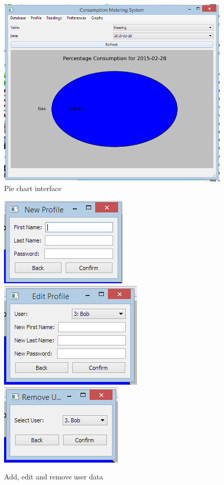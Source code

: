 \begin{landscape}
\begin{figure}[H]
	\includegraphics{./maintenance/images/UI_Pie_View.png}
	\caption{Pie chart interface}
\end{figure}
\end{landscape}

\begin{figure}[H]
	\includegraphics{./maintenance/images/UI_Add_User.png}
	\includegraphics{./maintenance/images/UI_Edit_User.png}
	\includegraphics{./maintenance/images/UI_Remove_User.png}
	\caption{Add, edit and remove user data}
\end{figure}

